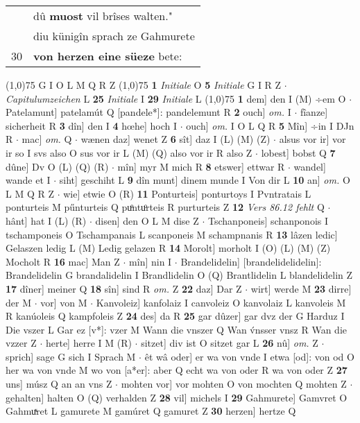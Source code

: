\documentclass[8pt,a4paper,notitlepage]{article}
\begin{document}
\begin{table}[ht]
\begin{minipage}[t]{0.5\linewidth}
\begin{tabular}{rl}
 & dû \textbf{muost} vil brîses walten."\\ 
 & diu künigîn sprach ze Gahmurete\\ 
30 & \textbf{von herzen eine süeze} bete:\\ 
\end{tabular}
\scriptsize
\line(1,0){75} \newline
G I O L M Q R Z \newline
\line(1,0){75} \newline
\textbf{1} \textit{Initiale} O  \textbf{5} \textit{Initiale} G I R Z   $\cdot$ \textit{Capitulumzeichen} L  \textbf{25} \textit{Initiale} I  \textbf{29} \textit{Initiale} L  \newline
\line(1,0){75} \newline
\textbf{1} dem] den I (M) ÷em O  $\cdot$ Patelamunt] patelamút Q [pandele*]: pandelemunt R \textbf{2} ouch] \textit{om.} I  $\cdot$ fîanze] sicherheit R \textbf{3} dîn] den I \textbf{4} hœhe] hoch I  $\cdot$ ouch] \textit{om.} I O L Q R \textbf{5} Mîn] ÷in I DJn R  $\cdot$ mac] \textit{om.} Q  $\cdot$ wænen daz] wenet Z \textbf{6} sît] daz I (L) (M) (Z)  $\cdot$ alsus vor ir] vor ir so I svs also O sus vor ir L (M) (Q) also vor ir R also Z  $\cdot$ lobest] bobst Q \textbf{7} dûne] Dv O (L) (Q) (R)  $\cdot$ mîn] myr M mich R \textbf{8} etswer] ettwar R  $\cdot$ wandel] wande et I  $\cdot$ siht] geschiht L \textbf{9} dîn munt] dinem munde I Von dir L \textbf{10} an] \textit{om.} O L M Q R Z  $\cdot$ wie] etwie O (R) \textbf{11} Ponturteis] ponturtoys I Pvntratais L ponturteis M pűnturteis Q puͦntuͦrteis R purturteis Z \textbf{12} \textit{Vers 86.12 fehlt} Q   $\cdot$ hânt] hat I (L) (R)  $\cdot$ disen] den O L M dise Z  $\cdot$ Tschanponeis] schanponois I tschamponeis O Tschampanais L scanponeis M schampnanis R \textbf{13} lâzen ledic] Gelaszen ledig L (M) Ledig gelazen R \textbf{14} Morolt] morholt I (O) (L) (M) (Z) Mocholt R \textbf{16} mac] Man Z  $\cdot$ mîn] nin I  $\cdot$ Brandelidelin] [brandelidelidelin]: Brandelidelin G brandalidelin I Brandlidelin O (Q) Brantlidelin L blandelidelin Z \textbf{17} dîner] meiner Q \textbf{18} sîn] sind R \textit{om.} Z \textbf{22} daz] Dar Z  $\cdot$ wirt] werde M \textbf{23} dirre] der M  $\cdot$ vor] von M  $\cdot$ Kanvoleiz] kanfolaiz I canvoleiz O kanvolaiz L kanvoleis M R kanúoleis Q kampfoleis Z \textbf{24} des] da R \textbf{25} gar dûzer] gar dvz der G Harduz I Die vszer L Gar ez [v*]: vzer M Wann die vnszer Q Wan v́nsser vnsz R Wan die vzzer Z  $\cdot$ herte] herre I M (R)  $\cdot$ sitzet] div ist O sitzet gar L \textbf{26} nû] \textit{om.} Z  $\cdot$ sprich] sage G sich I Sprach M  $\cdot$ êt wâ oder] er wa von vnde I etwa [od]: von od O her wa von vnde M wo von [a*er]: aber Q echt wa von oder R wa von oder Z \textbf{27} uns] músz Q an an vns Z  $\cdot$ mohten vor] vor mohten O von mochten Q mohten Z  $\cdot$ gehalten] halten O (Q) verhalden Z \textbf{28} vil] michels I \textbf{29} Gahmurete] Gamvret O Gahmuͯret L gamurete M gamúret Q gamuret Z \textbf{30} herzen] hertze Q \newline

\end{minipage}
\end{table}
\end{document}
